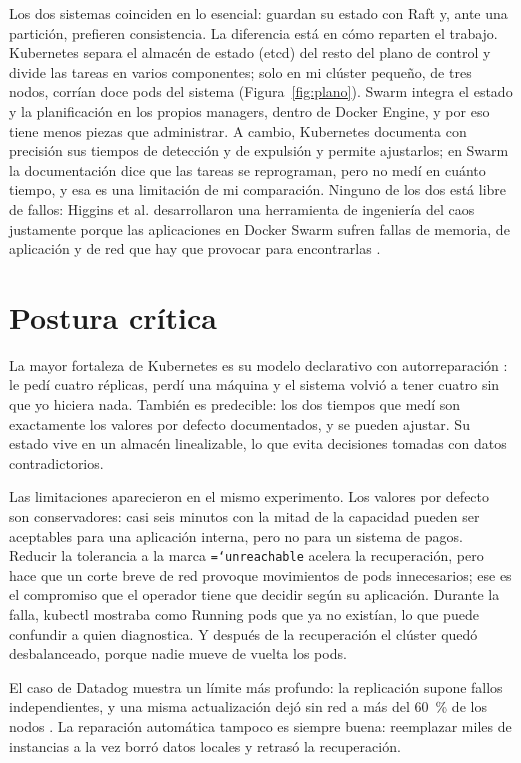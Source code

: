 \documentclass[11pt,a4paper]{article}
\newcommand{\cmd}[1]{\texttt{\hyphenchar\font=`\-\relax #1}}
\begin{document}
Los dos sistemas coinciden en lo esencial: guardan su estado con Raft y, ante una partición, prefieren consistencia. La diferencia está en cómo reparten el trabajo. Kubernetes separa el almacén de estado (etcd) del resto del plano de control y divide las tareas en varios componentes; solo en mi clúster pequeño, de tres nodos, corrían doce pods del sistema (Figura~\ref{fig:plano}). Swarm integra el estado y la planificación en los propios managers, dentro de Docker Engine, y por eso tiene menos piezas que administrar. A cambio, Kubernetes documenta con precisión sus tiempos de detección y de expulsión y permite ajustarlos; en Swarm la documentación dice que las tareas se reprograman, pero no medí en cuánto tiempo, y esa es una limitación de mi comparación. Ninguno de los dos está libre de fallos: Higgins et al. desarrollaron una herramienta de ingeniería del caos justamente porque las aplicaciones en Docker Swarm sufren fallas de memoria, de aplicación y de red que hay que provocar para encontrarlas \cite{higgins2024}.

\section{Postura crítica}

La mayor fortaleza de Kubernetes es su modelo declarativo con autorreparación \cite[p.~1]{senjab2023}: le pedí cuatro réplicas, perdí una máquina y el sistema volvió a tener cuatro sin que yo hiciera nada. También es predecible: los dos tiempos que medí son exactamente los valores por defecto documentados, y se pueden ajustar. Su estado vive en un almacén linealizable, lo que evita decisiones tomadas con datos contradictorios.

Las limitaciones aparecieron en el mismo experimento. Los valores por defecto son conservadores: casi seis minutos con la mitad de la capacidad pueden ser aceptables para una aplicación interna, pero no para un sistema de pagos. Reducir la tolerancia a la marca \cmd{unreachable} acelera la recuperación, pero hace que un corte breve de red provoque movimientos de pods innecesarios; ese es el compromiso que el operador tiene que decidir según su aplicación. Durante la falla, kubectl mostraba como Running pods que ya no existían, lo que puede confundir a quien diagnostica. Y después de la recuperación el clúster quedó desbalanceado, porque nadie mueve de vuelta los pods.

El caso de Datadog muestra un límite más profundo: la replicación supone fallos independientes, y una misma actualización dejó sin red a más del 60~\% de los nodos \cite{datadog2023}. La reparación automática tampoco es siempre buena: reemplazar miles de instancias a la vez borró datos locales y retrasó la recuperación.
\end{document}
